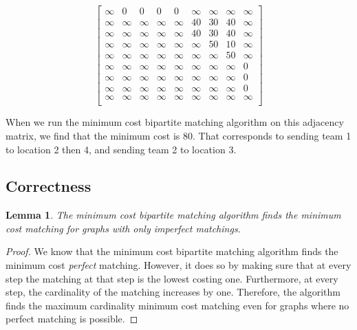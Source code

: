 \documentclass[12pt]{article}
\newtheorem{lemma}[theorem]{Lemma}
\begin{document}
\begin{center}
    \[
        \begin{bmatrix}
            \infty & 0 & 0 & 0 & 0 & \infty & \infty & \infty & \infty \\
            \infty & \infty & \infty & \infty & \infty & 40 & 30 & 40 & \infty \\
            \infty & \infty & \infty & \infty & \infty & 40 & 30 & 40 & \infty \\
            \infty & \infty & \infty & \infty & \infty & \infty & 50 & 10 & \infty \\
            \infty & \infty & \infty & \infty & \infty & \infty & \infty & 50 & \infty \\
            \infty & \infty & \infty & \infty & \infty & \infty & \infty & \infty & 0 \\
            \infty & \infty & \infty & \infty & \infty & \infty & \infty & \infty & 0 \\
            \infty & \infty & \infty & \infty & \infty & \infty & \infty & \infty & 0 \\
            \infty & \infty & \infty & \infty & \infty & \infty & \infty & \infty & \infty \\
        \end{bmatrix}
    \]
\end{center}

\hfill

When we run the minimum cost bipartite matching algorithm on this adjacency
matrix, we find that the minimum cost is 80. That corresponds to sending
team 1 to location 2 then 4, and sending team 2 to location 3.

\subsection{Correctness}

\begin{lemma}
    The minimum cost bipartite matching algorithm finds the minimum
    cost matching for graphs with only imperfect matchings.
\end{lemma}

\begin{proof}
    We know that the minimum cost bipartite matching algorithm finds
    the minimum cost {\em perfect} matching. However, it does so
    by making sure that at every step the matching at that step
    is the lowest costing one. Furthermore, at every step, the cardinality
    of the matching increases by one. Therefore, the algorithm
    finds the maximum cardinality minimum cost matching even
    for graphs where no perfect matching is possible.
\end{proof}
\end{document}

